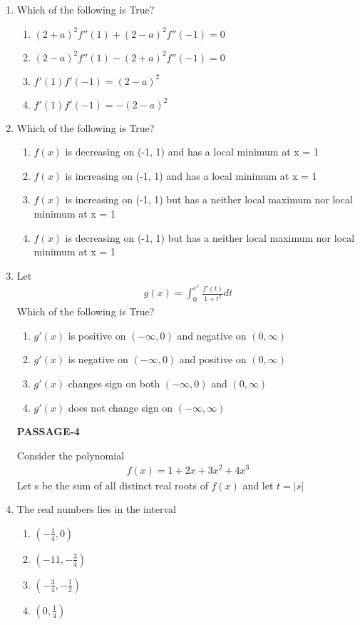 \begin{enumerate}[label=\arabic*.,ref=\thesubsection.\theenumi]
\item Which of the following is True?
\begin{enumerate}
\item $(2 + a)^2 f''(1) + (2 - a)^2 f''(-1) = 0$
\item $(2 - a)^2 f''(1) - (2 + a)^2 f''(-1) = 0$
\item $f'(1)f'(-1) = (2 - a)^2$
\item $f'(1)f'(-1) = -(2 - a)^2$
\end{enumerate}

\item Which of the following is True?
\begin{enumerate}
\item $f(x)$ is decreasing on (-1, 1) and has a local minimum at x = 1
\item $f(x)$ is increasing on (-1, 1) and has a local minimum at x = 1
\item $f(x)$ is increasing on (-1, 1) but has a neither local maximum nor local minimum at x = 1
\item $f(x)$ is decreasing on (-1, 1) but has a neither local maximum nor local minimum at x = 1
\end{enumerate}

\item Let 
\begin{align*}
g(x) = \int_{0}^{e^x}\frac{f'(t)}{1 + t^2}dt
\end{align*}
Which of the following is True?
\begin{enumerate}
\item $g'(x)$ is positive on $(-\infty, 0)$ and negative on $(0, \infty)$
\item $g'(x)$ is negative on $(-\infty, 0)$ and positive on $(0, \infty)$
\item $g'(x)$ changes sign on both $(-\infty, 0)$ and $(0, \infty)$
\item $g'(x)$ does not change sign on $(-\infty, \infty)$
\end{enumerate}

\textbf{PASSAGE-4}

Consider the polynomial
\begin{align}
f(x) = 1 + 2x + 3x^2 + 4x^3
\end{align}
Let s be the sum of all distinct real roots of $f(x)$ and let $t = |s|$ 

\item The real numbers lies in the interval
\begin{enumerate}
\item $\left(-\frac{1}{4}, 0\right)$
\item $\left(-11, -\frac{3}{4}\right)$
\item $\left(-\frac{3}{4}, -\frac{1}{2}\right)$
\item $\left(0, \frac{1}{4}\right)$
\end{enumerate}


\end{enumerate}
